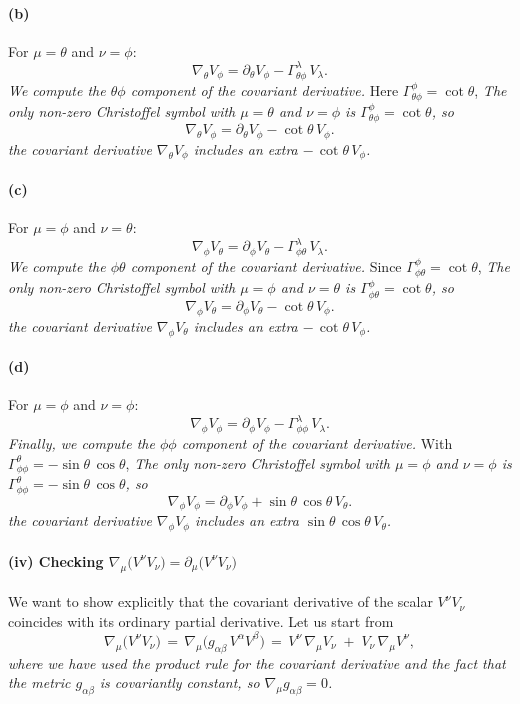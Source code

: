 \documentclass{article}
\begin{document}
\paragraph{(b)} For \(\mu = \theta\) and \(\nu = \phi\):
\[
\nabla_{\theta} V_\phi
=
\partial_\theta V_\phi
-
\Gamma^\lambda_{\theta\phi}\,V_\lambda.
\]
\emph{We compute the \(\theta\phi\) component of the covariant derivative.}
Here \(\Gamma^\phi_{\theta\phi} = \cot\theta\),
\emph{The only non-zero Christoffel symbol with \(\mu = \theta\) and \(\nu = \phi\) is \(\Gamma^\phi_{\theta\phi} = \cot\theta\), so}
\[
\nabla_{\theta} V_\phi
=
\partial_\theta V_\phi
-
\cot\theta \, V_\phi.
\]
\emph{the covariant derivative \(\nabla_{\theta} V_\phi\) includes an extra \(-\,\cot\theta \, V_\phi\).}

\paragraph{(c)} For \(\mu = \phi\) and \(\nu = \theta\):
\[
\nabla_{\phi} V_\theta
=
\partial_\phi V_\theta
-
\Gamma^\lambda_{\phi\theta}\,V_\lambda.
\]
\emph{We compute the \(\phi\theta\) component of the covariant derivative.}
Since \(\Gamma^\phi_{\phi\theta} = \cot\theta\),
\emph{The only non-zero Christoffel symbol with \(\mu = \phi\) and \(\nu = \theta\) is \(\Gamma^\phi_{\phi\theta} = \cot\theta\), so}
\[
\nabla_{\phi} V_\theta
=
\partial_\phi V_\theta
-
\cot\theta \, V_\phi.
\]
\emph{the covariant derivative \(\nabla_{\phi} V_\theta\) includes an extra \(-\,\cot\theta \, V_\phi\).}

\paragraph{(d)} For \(\mu = \phi\) and \(\nu = \phi\):
\[
\nabla_{\phi} V_\phi
=
\partial_\phi V_\phi
-
\Gamma^\lambda_{\phi\phi}\,V_\lambda.
\]
\emph{Finally, we compute the \(\phi\phi\) component of the covariant derivative.}
With \(\Gamma^\theta_{\phi\phi} = -\sin\theta\,\cos\theta\),
\emph{The only non-zero Christoffel symbol with \(\mu = \phi\) and \(\nu = \phi\) is \(\Gamma^\theta_{\phi\phi} = -\sin\theta\,\cos\theta\), so}
\[
\nabla_{\phi} V_\phi
=
\partial_\phi V_\phi
+
\sin\theta\,\cos\theta \, V_\theta.
\]
\emph{the covariant derivative \(\nabla_{\phi} V_\phi\) includes an extra \(\sin\theta\,\cos\theta \, V_\theta\).}

\paragraph*{(iv) Checking \(\nabla_{\mu}\bigl(V^{\nu} V_{\nu}\bigr)=\partial_{\mu}\bigl(V^{\nu} V_{\nu}\bigr)\)}
We want to show explicitly that the covariant derivative of the scalar \(V^\nu V_\nu\) coincides with its ordinary partial derivative. Let us start from
\[
\nabla_\mu \bigl(V^\nu V_\nu \bigr)
\,=\,
\nabla_\mu \bigl(g_{\alpha\beta}\,V^\alpha V^\beta \bigr)
\,=\,
V^\nu \,\nabla_\mu V_\nu
\;+\;
V_\nu \,\nabla_\mu V^\nu,
\]
\emph{where we have used the product rule for the covariant derivative and the fact that the metric \(g_{\alpha\beta}\) is covariantly constant, so \(\nabla_\mu g_{\alpha\beta} = 0\).}
\end{document}

